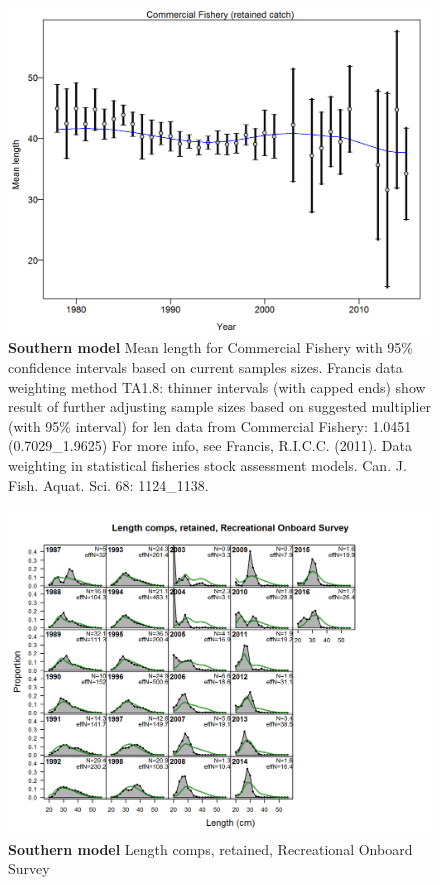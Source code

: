 \documentclass[12pt,]{article}
\begin{document}
\begin{figure}[htbp]
\centering
\includegraphics{./r4ss/plots_mod2/comp_lenfit_data_weighting_TA1.8_Commercial Fishery.png}
\caption{\textbf{Southern model} Mean length for Commercial Fishery with
95\% confidence intervals based on current samples sizes. Francis data
weighting method TA1.8: thinner intervals (with capped ends) show result
of further adjusting sample sizes based on suggested multiplier (with
95\% interval) for len data from Commercial Fishery: 1.0451
(0.7029\_1.9625) For more info, see Francis, R.I.C.C. (2011). Data
weighting in statistical fisheries stock assessment models. Can. J.
Fish. Aquat. Sci. 68: 1124\_1138.
\label{fig:mod2_8_comp_lenfit_data_weighting_TA1.8_Commercial Fishery}}
\end{figure}

\begin{figure}[htbp]
\centering
\includegraphics{./r4ss/plots_mod2/comp_lenfit_flt3mkt2.png}
\caption{\textbf{Southern model} Length comps, retained, Recreational
Onboard Survey \label{fig:mod2_9_comp_lenfit_flt3mkt2}}
\end{figure}
\end{document}
